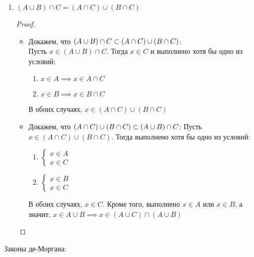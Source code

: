 \begin{props}
\begin{enumerate}
\begin{proof}
\begin{itemize}
\begin{enumerate}
				\end{enumerate}
			\end{itemize}
		\end{proof}
		\item $(A \cup B) \cap C = (A \cap C) \cup (B \cap C)$
		\begin{proof}
			\hfill
			\begin{itemize}
				\item Докажем, что $(A \cup B) \cap C \subset (A \cap C) \cup (B \cap C)$: \\
				Пусть $x \in (A \cup B) \cap C$. Тогда $x \in C$ и выполнено хотя бы одно из условий:
				\begin{enumerate}
					\item $x \in A \implies x \in A \cap C$
					\item $x \in B \implies x \in B \cap C$
				\end{enumerate}
				В обоих случаях, $x \in (A \cap C) \cup (B \cap C)$
				\item Докажем, что $(A \cap C) \cup (B \cap C) \subset (A \cup B) \cap C$:
				Пусть $x \in (A \cap C) \cup (B \cap C)$. Тогда выполнено хотя бы одно из условий:
				\begin{enumerate}
					\item $
					\begin{cases}
						x \in A \\
						x \in C
					\end{cases} $
					\item $
					\begin{cases}
						x \in B \\
						x \in C
					\end{cases} $
				\end{enumerate}
				В обоих случаях, $x \in C$. Кроме того, выполнено $x \in A$ или $x \in B$, а значит, $x \in A \cup B \implies x \in (A \cup C) \cap (A \cup B)$
			\end{itemize}
		\end{proof}
	\end{enumerate}
	\item Законы де-Моргана:
\end{props}
